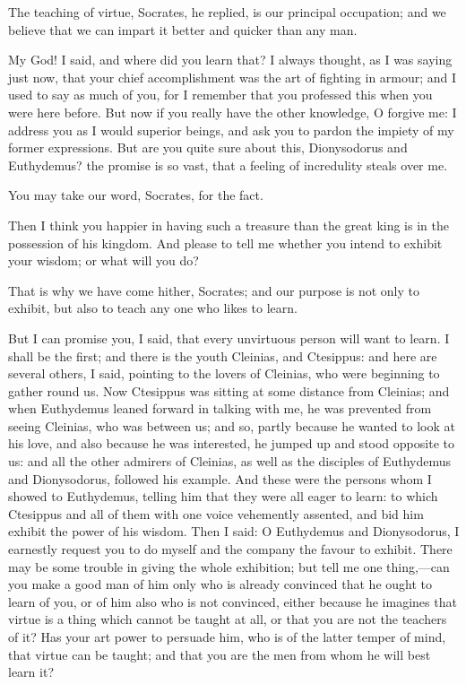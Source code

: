 \documentclass[11pt,letter]{article}
\begin{document}
\par  The teaching of virtue, Socrates, he replied, is our principal occupation; and we believe that we can impart it better and quicker than any man.

\par  My God! I said, and where did you learn that? I always thought, as I was saying just now, that your chief accomplishment was the art of fighting in armour; and I used to say as much of you, for I remember that you professed this when you were here before. But now if you really have the other knowledge, O forgive me: I address you as I would superior beings, and ask you to pardon the impiety of my former expressions. But are you quite sure about this, Dionysodorus and Euthydemus? the promise is so vast, that a feeling of incredulity steals over me.

\par  You may take our word, Socrates, for the fact.

\par  Then I think you happier in having such a treasure than the great king is in the possession of his kingdom. And please to tell me whether you intend to exhibit your wisdom; or what will you do?

\par  That is why we have come hither, Socrates; and our purpose is not only to exhibit, but also to teach any one who likes to learn.

\par  But I can promise you, I said, that every unvirtuous person will want to learn. I shall be the first; and there is the youth Cleinias, and Ctesippus: and here are several others, I said, pointing to the lovers of Cleinias, who were beginning to gather round us. Now Ctesippus was sitting at some distance from Cleinias; and when Euthydemus leaned forward in talking with me, he was prevented from seeing Cleinias, who was between us; and so, partly because he wanted to look at his love, and also because he was interested, he jumped up and stood opposite to us: and all the other admirers of Cleinias, as well as the disciples of Euthydemus and Dionysodorus, followed his example. And these were the persons whom I showed to Euthydemus, telling him that they were all eager to learn: to which Ctesippus and all of them with one voice vehemently assented, and bid him exhibit the power of his wisdom. Then I said: O Euthydemus and Dionysodorus, I earnestly request you to do myself and the company the favour to exhibit. There may be some trouble in giving the whole exhibition; but tell me one thing,—can you make a good man of him only who is already convinced that he ought to learn of you, or of him also who is not convinced, either because he imagines that virtue is a thing which cannot be taught at all, or that you are not the teachers of it? Has your art power to persuade him, who is of the latter temper of mind, that virtue can be taught; and that you are the men from whom he will best learn it?
\end{document}
